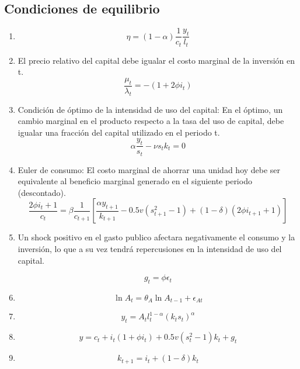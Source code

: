 \documentclass{article}
\begin{document}
\subsection{Condiciones de equilibrio}
\begin{enumerate}
	\item 
	$$
	\eta=(1-\alpha)\frac{1}{c_t} \frac{y_{t}} {l_{t}}
	$$ 
	\item El precio relativo del capital debe igualar el costo marginal de la inversión en t.
	$$
	\frac{\mu_{t}}{\lambda_{t}}=-(1+2 \phi i_{t})
	$$
	\item Condición de óptimo de la intensidad de uso del capital: En el óptimo, un cambio marginal en el producto respecto a la tasa del uso de capital, debe igualar una fracción del capital utilizado en el periodo t.  
	$$
	\alpha\frac{y_t}{s_t}-\nu s_tk_t=0
	$$
	\item Euler de consumo: El costo marginal de ahorrar una unidad hoy debe ser equivalente al beneficio marginal generado en el siguiente periodo (descontado). 
	$$
	\frac{2\phi i_t+1}{c_t} = \beta \frac{1}{c_{t+1}}\left[ \frac{\alpha y_{t+1}}{k_{t+1}}-0.5v(s^2_{t+1}-1) + (1-\delta)(2\phi i_{t+1} +1)\right]
	$$
	
	
	\item Un shock positivo en el gasto publico afectara negativamente el consumo y la inversión, lo que a su vez tendrá repercusiones en la intensidad de uso del capital. 
	
	
	$$
	g_t=\phi \epsilon_t
	$$
	\item 
	$$
	\ln A_{t}=\theta_{A} \ln A_{t-1}+\epsilon_{A t}
	$$
	\item 
	$$
	y_{t}=A_{t} l_{t}^{1-\alpha}\left(k_{t} s_{t}\right)^{\alpha}
	$$
	\item 
	$$ 
	y= c_t+i_t(1+\phi i_t) + 0.5v(s^2_t-1)k_t + g_t
	$$
	\item
	$$
	k_{t+1}=i_{t}+(1-\delta) k_{t}
	$$
\end{enumerate}
\end{document}
